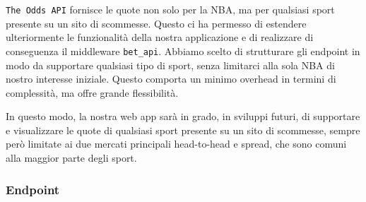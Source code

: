 \texttt{The Odds API} fornisce le quote non solo per la NBA, ma per qualsiasi sport presente su un sito di scommesse. Questo ci ha permesso di estendere ulteriormente le funzionalità della nostra applicazione e di realizzare di conseguenza il middleware \texttt{bet\_api}. Abbiamo scelto di strutturare gli endpoint in modo da supportare qualsiasi tipo di sport, senza limitarci alla sola NBA di nostro interesse iniziale. Questo comporta un minimo overhead in termini di complessità, ma offre grande flessibilità.

In questo modo, la nostra web app sarà in grado, in sviluppi futuri, di supportare e visualizzare le quote di qualsiasi sport presente su un sito di scommesse, sempre però limitate ai due mercati principali head-to-head e spread, che sono comuni alla maggior parte degli sport.

\subsubsection{Endpoint}

